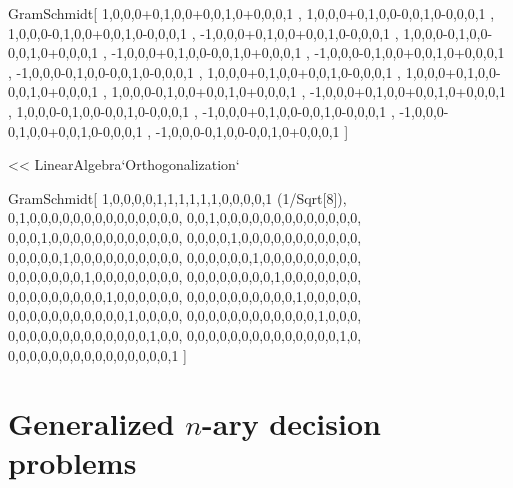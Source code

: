 GramSchmidt[{                             {1,0,0,0}+{0,1,0,0}+{0,0,1,0}+{0,0,0,1}       ,
                              {1,0,0,0}+{0,1,0,0}-{0,0,1,0}-{0,0,0,1}       ,
                              {1,0,0,0}-{0,1,0,0}+{0,0,1,0}-{0,0,0,1}       ,
                              -{1,0,0,0}+{0,1,0,0}+{0,0,1,0}-{0,0,0,1}       ,
                              {1,0,0,0}-{0,1,0,0}-{0,0,1,0}+{0,0,0,1}       ,
                              -{1,0,0,0}+{0,1,0,0}-{0,0,1,0}+{0,0,0,1}       ,
                              -{1,0,0,0}-{0,1,0,0}+{0,0,1,0}+{0,0,0,1}       ,
                              -{1,0,0,0}-{0,1,0,0}-{0,0,1,0}-{0,0,0,1}       ,
            {1,0,0,0}+{0,1,0,0}+{0,0,1,0}-{0,0,0,1}       ,
                              {1,0,0,0}+{0,1,0,0}-{0,0,1,0}+{0,0,0,1}       ,
                              {1,0,0,0}-{0,1,0,0}+{0,0,1,0}+{0,0,0,1}       ,
                              -{1,0,0,0}+{0,1,0,0}+{0,0,1,0}+{0,0,0,1}       ,
                              {1,0,0,0}-{0,1,0,0}-{0,0,1,0}-{0,0,0,1}       ,
                              -{1,0,0,0}+{0,1,0,0}-{0,0,1,0}-{0,0,0,1}       ,
                              -{1,0,0,0}-{0,1,0,0}+{0,0,1,0}-{0,0,0,1}       ,
                              -{1,0,0,0}-{0,1,0,0}-{0,0,1,0}+{0,0,0,1}     }]


<< LinearAlgebra`Orthogonalization`

GramSchmidt[{
{1,0,0,0,0,1,1,1,1,1,1,0,0,0,0,1} (1/Sqrt[8]),
{0,1,0,0,0,0,0,0,0,0,0,0,0,0,0,0},
{0,0,1,0,0,0,0,0,0,0,0,0,0,0,0,0},
{0,0,0,1,0,0,0,0,0,0,0,0,0,0,0,0},
{0,0,0,0,1,0,0,0,0,0,0,0,0,0,0,0},
{0,0,0,0,0,1,0,0,0,0,0,0,0,0,0,0},
{0,0,0,0,0,0,1,0,0,0,0,0,0,0,0,0},
{0,0,0,0,0,0,0,1,0,0,0,0,0,0,0,0},
{0,0,0,0,0,0,0,0,1,0,0,0,0,0,0,0},
{0,0,0,0,0,0,0,0,0,1,0,0,0,0,0,0},
{0,0,0,0,0,0,0,0,0,0,1,0,0,0,0,0},
{0,0,0,0,0,0,0,0,0,0,0,1,0,0,0,0},
{0,0,0,0,0,0,0,0,0,0,0,0,1,0,0,0},
{0,0,0,0,0,0,0,0,0,0,0,0,0,1,0,0},
{0,0,0,0,0,0,0,0,0,0,0,0,0,0,1,0},
{0,0,0,0,0,0,0,0,0,0,0,0,0,0,0,1}
            }]


\section{Generalized $n$-ary decision problems}


